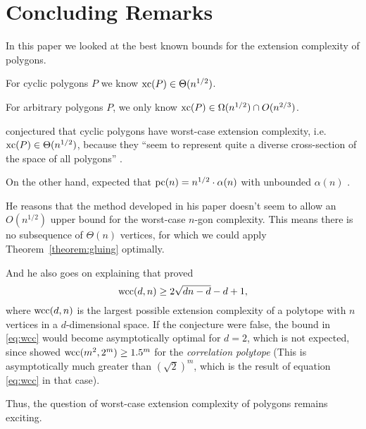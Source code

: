 \section{Concluding Remarks}

In this paper we looked at the best known bounds for the extension complexity of polygons.

For cyclic polygons $P$ we know $\operatorname{xc}(P) \in \Theta(n^{1/2})$.

For arbitrary polygons $P$, we only know $\operatorname{xc}(P) \in \Omega(n^{1/2}) \cap O(n^{2/3})$.

\textcite{kwan2020extension} conjectured that cyclic polygons have worst-case extension complexity, i.e.\ $\operatorname{xc}(P) \in \Theta(n^{1/2})$, because they ``seem to represent quite a diverse cross-section of the space of all polygons'' \cite[3]{kwan2020extension}.

On the other hand, \textcite{shitov2020sublinear} expected that $\operatorname{pc}(n) = n^{1/2} \cdot \alpha(n)$ with unbounded $\alpha(n)$ \cite[Conjecture 61]{shitov2020sublinear}.

He reasons that the method developed in his paper doesn't seem to allow an $O(n^{1/2})$ upper bound for the worst-case $n$-gon complexity. This means there is no subsequence of $\Theta(n)$ vertices, for which we could apply Theorem~\ref{theorem:gluing} optimally.

And he also goes on explaining that \textcite{padrol2016extension} proved
\begin{equation}\label{eq:wcc}
  \operatorname{wcc}(d,n) \geq 2\sqrt{dn-d}-d+1 ,
\end{equation}
where $\operatorname{wcc}(d,n)$ is the largest possible extension complexity of a polytope with $n$ vertices in a $d$-dimensional space.
If the conjecture were false, the bound in \eqref{eq:wcc} would become asymptotically optimal for $d=2$, which is not expected, since \textcite{kaibel2015short} showed $\operatorname{wcc}(m^2,2^m) \geq 1.5^m$ for the \emph{correlation polytope} (This is asymptotically much greater than $(\sqrt{2})^m$, which is the result of equation \eqref{eq:wcc} in that case).

Thus, the question of worst-case extension complexity of polygons remains exciting.
